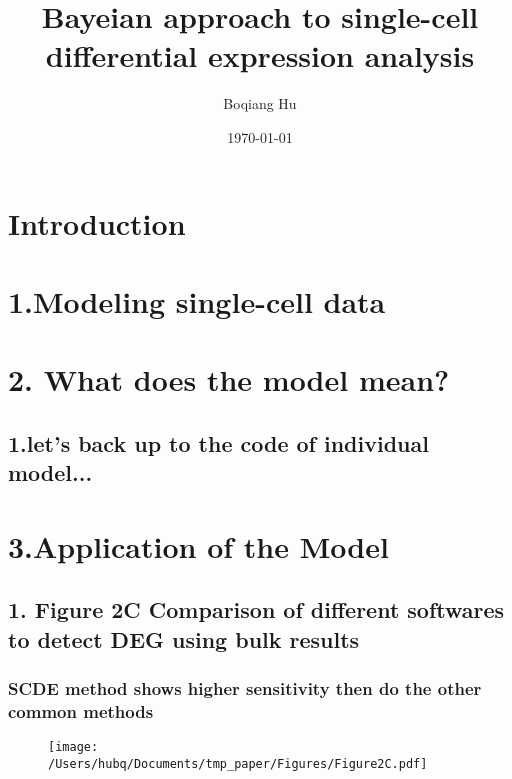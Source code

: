 \documentclass[slidestop,compress,mathserif]{beamer} %
\begin{document}
    \title{Bayeian approach to single-cell differential expression analysis}
    \author{Boqiang Hu}
    \date{\today}
    \begin{frame}
    	 \titlepage
    \end{frame}

 
\section{Introduction}

\section{1.Modeling single-cell data} 


\section{2. What does the model mean?}
\subsection{1.let's back up to the code of individual model...  }



\section{3.Application of the Model} 

\subsection{1. Figure 2C Comparison of different softwares to detect DEG using bulk results} 
\begin{frame}

	\frametitle{SCDE method shows higher sensitivity then do the other common methods}
	\begin{figure}[htbp]
	\texttt{[image: /Users/hubq/Documents/tmp\_paper/Figures/Figure2C.pdf]}
	\end{figure} 
\end{frame}
\end{document}

